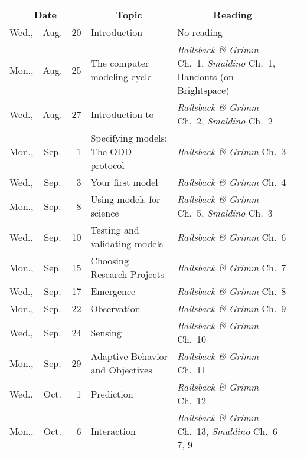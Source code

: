 \documentclass[11pt,twoside]{jgsyllabus}\usepackage[]{graphicx}\usepackage[]{xcolor}
\begin{document}
\setlength{\aboverulesep}{0.2ex}
\setlength{\belowrulesep}{0.2ex}
\setlength{\extrarowheight}{0.1ex}
\setlength{\heavyrulewidth}{0.5pt}
\setlength{\lightrulewidth}{0.05pt}
\begin{center}
\begin{tabular}{l@{~}c@{~}r>{\raggedright}m{2.6in}>{\centering}m{2in}c}
  \toprule
  \multicolumn{3}{c}{\bfseries Date} & \multicolumn{1}{c}{\bfseries Topic} &\multicolumn{1}{c}{\bfseries Reading} &\\
 \midrule
Wed., & Aug. &  20 & Introduction & No reading &  \\ 
   \midrule
Mon., & Aug. &  25 & The computer modeling cycle & \emph{Railsback \& Grimm\/} Ch.~1, \emph{Smaldino\/} Ch.~1, Handouts (on Brightspace) &  \\ 
   \midrule
Wed., & Aug. &  27 & Introduction to \NetLogo{} & \emph{Railsback \& Grimm\/} Ch.~2, \emph{Smaldino\/} Ch.~2 &  \\ 
   \midrule
Mon., & Sep. &   1 & Specifying models: The ODD protocol & \emph{Railsback \& Grimm\/} Ch.~3 &  \\ 
   \midrule
Wed., & Sep. &   3 & Your first model & \emph{Railsback \& Grimm\/} Ch.~4 &  \\ 
   \midrule
Mon., & Sep. &   8 & Using models for science & \emph{Railsback \& Grimm\/} Ch.~5, \emph{Smaldino\/} Ch.~3 &  \\ 
   \midrule
Wed., & Sep. &  10 & Testing and validating models & \emph{Railsback \& Grimm\/} Ch.~6 &  \\ 
   \midrule
Mon., & Sep. &  15 & Choosing Research Projects & \emph{Railsback \& Grimm\/} Ch.~7 &  \\ 
   \midrule
Wed., & Sep. &  17 & Emergence & \emph{Railsback \& Grimm\/} Ch.~8 &  \\ 
   \midrule
Mon., & Sep. &  22 & Observation & \emph{Railsback \& Grimm\/} Ch.~9 &  \\ 
   \midrule
Wed., & Sep. &  24 & Sensing & \emph{Railsback \& Grimm\/} Ch.~10 &  \\ 
   \midrule
Mon., & Sep. &  29 & Adaptive Behavior and Objectives & \emph{Railsback \& Grimm\/} Ch.~11 &  \\ 
   \midrule
Wed., & Oct. &   1 & Prediction & \emph{Railsback \& Grimm\/} Ch.~12 &  \\ 
   \midrule
Mon., & Oct. &   6 & Interaction & \emph{Railsback \& Grimm\/} Ch.~13, \emph{Smaldino\/} Ch.~6--7, 9 &  \\ 

\end{tabular}
\end{center}
\end{document}
